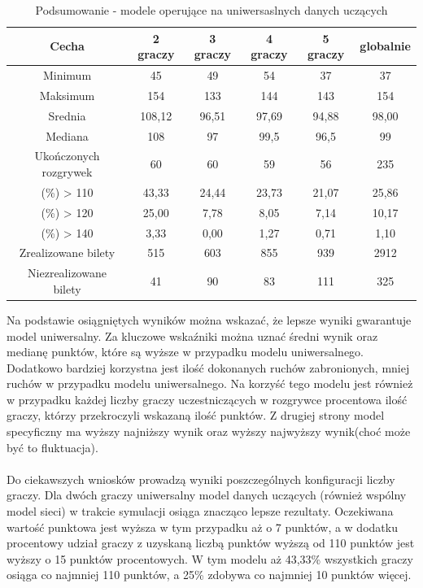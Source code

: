 \documentclass[12pt, oneside]{report}
\begin{document}
	\begin{table}[h]
		\begin{center}
			\begin{tabular}{| c | c | c | c | c | c |} \hline
				Cecha & 2 graczy & 3 graczy & 4 graczy & 5 graczy & globalnie \\ \hline
				Minimum & 45 & 49 & 54 & 37 & 37 \\ \hline
				Maksimum & 154 & 133 & 144 & 143 & 154 \\ \hline
				Srednia & 108,12 & 96,51 & 97,69 & 94,88 & 98,00 \\ \hline
				Mediana & 108 & 97 & 99,5 & 96,5 & 99 \\ \hline
				Ukończonych rozgrywek & 60 & 60 & 59 & 56 & 235 \\ \hline
				(\%) > 110 & 43,33 & 24,44 & 23,73 & 21,07 & 25,86 \\ \hline
				(\%) > 120 & 25,00 & 7,78 & 8,05 & 7,14 & 10,17 \\ \hline
				(\%) > 140 & 3,33 & 0,00 & 1,27 & 0,71 & 1,10 \\ \hline
				Zrealizowane bilety & 515 & 603 & 855 & 939 & 2912 \\ \hline
				Niezrealizowane bilety & 41 & 90 & 83 & 111 & 325 \\ \hline
			\end{tabular}
			\caption{Podsumowanie - modele operujące na uniwersaslnych danych uczących}
			\label{table:nn_all_test}
		\end{center}
	\end{table}
	Na podstawie osiągniętych wyników można wskazać, że lepsze wyniki gwarantuje model uniwersalny. Za kluczowe wskaźniki można uznać średni wynik oraz medianę punktów, które są wyższe w przypadku modelu uniwersalnego. Dodatkowo bardziej korzystna jest ilość dokonanych ruchów zabronionych, mniej ruchów w przypadku modelu uniwersalnego. Na korzyść tego modelu jest również w przypadku każdej liczby graczy uczestniczących w rozgrywce procentowa ilość graczy, którzy przekroczyli wskazaną ilość punktów. Z drugiej strony model specyficzny ma wyższy najniższy wynik oraz wyższy najwyższy wynik(choć może być to fluktuacja). \\ \\ 
	Do ciekawszych wniosków prowadzą wyniki poszczególnych konfiguracji liczby graczy. Dla dwóch graczy uniwersalny model danych uczących (również wspólny model sieci) w trakcie symulacji osiąga znacząco lepsze rezultaty. Oczekiwana wartość punktowa jest wyższa w tym przypadku aż o 7 punktów, a w dodatku procentowy udział graczy z uzyskaną liczbą punktów wyższą od 110 punktów jest wyższy o 15 punktów procentowych. W tym modelu aż 43,33\% wszystkich graczy osiąga co najmniej 110 punktów, a 25\% zdobywa co najmniej 10 punktów więcej. 
\end{document}
